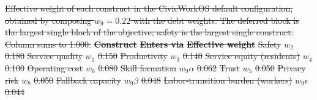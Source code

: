 \documentclass[utf8]{FrontiersinHarvard}
\providecommand{\DIFdel}[1]{{\protect\color{red}\sout{#1}}}                      %
\providecommand{\DIFdelFL}[1]{\DIFdel{#1}} %
\begin{document}
{%
\DIFdelFL{Effective weight of each construct in the CivicWorkOS default configuration, obtained by composing $w_9=0.22$ with the debt weights. The deferred block is the largest single block of the objective; safety is the largest single construct. Column sums to 1.000.}}
\textbf{\DIFdelFL{Construct}} %
\textbf{\DIFdelFL{Enters via}} %
\textbf{\DIFdelFL{Effective weight}}%
\DIFdelFL{Safety }%
\DIFdelFL{$w_2$ }%
\DIFdelFL{0.180}%
\DIFdelFL{Service quality }%
\DIFdelFL{$w_1$ }%
\DIFdelFL{0.150}%
\DIFdelFL{Productivity }%
\DIFdelFL{$w_3$ }%
\DIFdelFL{0.140}%
\DIFdelFL{Service equity (residents) }%
\DIFdelFL{$w_4$ }%
\DIFdelFL{0.100}%
\DIFdelFL{Operating cost }%
\DIFdelFL{$w_6$ }%
\DIFdelFL{0.080}%
\DIFdelFL{Skill formation }%
\DIFdelFL{$w_9\alpha$ }%
\DIFdelFL{0.062}%
\DIFdelFL{Trust }%
\DIFdelFL{$w_5$ }%
\DIFdelFL{0.050}%
\DIFdelFL{Privacy risk }%
\DIFdelFL{$w_8$ }%
\DIFdelFL{0.050}%
\DIFdelFL{Fallback capacity }%
\DIFdelFL{$w_9\beta$ }%
\DIFdelFL{0.048}%
\DIFdelFL{Labor-transition burden (workers) }%
\DIFdelFL{$w_9\epsilon$ }%
\DIFdelFL{0.044}%
\end{document}
